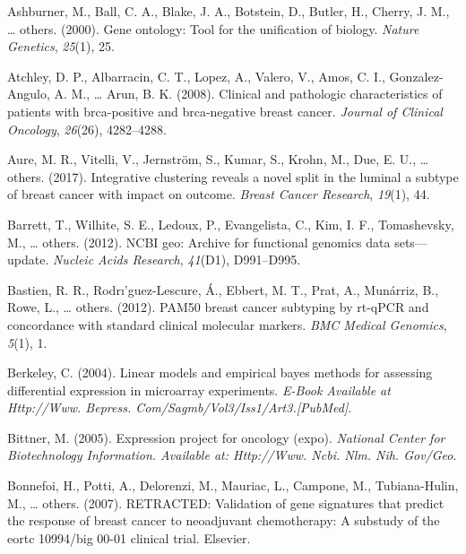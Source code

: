 \documentclass[12pt,twoside]{reedthesis}
\begin{document}
\hypertarget{refs}{}
\leavevmode\hypertarget{ref-ashburner2000gene}{}%
Ashburner, M., Ball, C. A., Blake, J. A., Botstein, D., Butler, H., Cherry, J. M., \ldots{} others. (2000). Gene ontology: Tool for the unification of biology. \emph{Nature Genetics}, \emph{25}(1), 25.

\leavevmode\hypertarget{ref-atchley2008clinical}{}%
Atchley, D. P., Albarracin, C. T., Lopez, A., Valero, V., Amos, C. I., Gonzalez-Angulo, A. M., \ldots{} Arun, B. K. (2008). Clinical and pathologic characteristics of patients with brca-positive and brca-negative breast cancer. \emph{Journal of Clinical Oncology}, \emph{26}(26), 4282--4288.

\leavevmode\hypertarget{ref-aure2017integrative}{}%
Aure, M. R., Vitelli, V., Jernström, S., Kumar, S., Krohn, M., Due, E. U., \ldots{} others. (2017). Integrative clustering reveals a novel split in the luminal a subtype of breast cancer with impact on outcome. \emph{Breast Cancer Research}, \emph{19}(1), 44.

\leavevmode\hypertarget{ref-barrett2012ncbi}{}%
Barrett, T., Wilhite, S. E., Ledoux, P., Evangelista, C., Kim, I. F., Tomashevsky, M., \ldots{} others. (2012). NCBI geo: Archive for functional genomics data sets---update. \emph{Nucleic Acids Research}, \emph{41}(D1), D991--D995.

\leavevmode\hypertarget{ref-bastien2012pam50}{}%
Bastien, R. R., Rodrı'guez-Lescure, Á., Ebbert, M. T., Prat, A., Munárriz, B., Rowe, L., \ldots{} others. (2012). PAM50 breast cancer subtyping by rt-qPCR and concordance with standard clinical molecular markers. \emph{BMC Medical Genomics}, \emph{5}(1), 1.

\leavevmode\hypertarget{ref-berkeley2004linear}{}%
Berkeley, C. (2004). Linear models and empirical bayes methods for assessing differential expression in microarray experiments. \emph{E-Book Available at Http://Www. Bepress. Com/Sagmb/Vol3/Iss1/Art3.{[}PubMed{]}}.

\leavevmode\hypertarget{ref-bittner2005expression}{}%
Bittner, M. (2005). Expression project for oncology (expo). \emph{National Center for Biotechnology Information. Available at: Http://Www. Ncbi. Nlm. Nih. Gov/Geo}.

\leavevmode\hypertarget{ref-bonnefoi2007retracted}{}%
Bonnefoi, H., Potti, A., Delorenzi, M., Mauriac, L., Campone, M., Tubiana-Hulin, M., \ldots{} others. (2007). RETRACTED: Validation of gene signatures that predict the response of breast cancer to neoadjuvant chemotherapy: A substudy of the eortc 10994/big 00-01 clinical trial. Elsevier.
\end{document}
